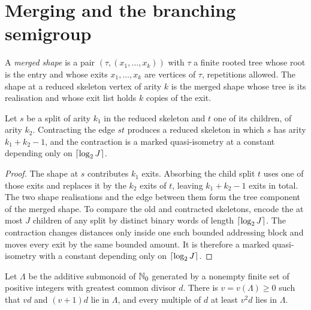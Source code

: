 \section{Merging and the branching semigroup}

\begin{definition}
\label{def:merged-shape}
\leanok
{}
A \emph{merged shape} is a pair $(\tau,(x_1,\dots,x_k))$ with $\tau$ a finite rooted tree whose
root is the entry and whose exits $x_1,\dots,x_k$ are vertices of $\tau$, repetitions allowed.
The shape at a reduced skeleton vertex of arity $k$ is the merged shape whose tree is its
realisation and whose exit list holds $k$ copies of the exit.
\end{definition}

\begin{lemma}
\label{thm:merge}
\leanok
{}
Let $s$ be a split of arity $k_1$ in the reduced skeleton and $t$ one of its children, of arity
$k_2$. Contracting the edge $st$ produces a reduced skeleton in which $s$ has arity
$k_1+k_2-1$, and the contraction is a marked quasi-isometry at a constant depending only on
$\lceil \log_2 J \rceil$.
\end{lemma}

\begin{proof}
\leanok
The shape at $s$ contributes $k_1$ exits. Absorbing the child split $t$ uses one of those exits
and replaces it by the $k_2$ exits of $t$, leaving $k_1+k_2-1$ exits in total. The two shape
realisations and the edge between them form the tree component of the merged shape. To compare the
old and contracted skeletons, encode the at most $J$ children of any split by distinct binary
words of length $\lceil \log_2J \rceil$. The contraction changes distances only inside one such bounded
addressing block and moves every exit by the same bounded amount. It is therefore a marked
quasi-isometry with a constant depending only on $\lceil \log_2J \rceil$.
\end{proof}

\begin{lemma}
\label{thm:semigroup-threshold}
\leanok
Let $\Lambda$ be the additive submonoid of $\mathbb{N}_0$ generated by a nonempty finite set of
positive integers with greatest common divisor $d$. There is $v=v(\Lambda)\geq0$ such that $vd$
and $(v+1)d$ lie in $\Lambda$, and every multiple of $d$ at least $v^2d$ lies in $\Lambda$.
\end{lemma}

